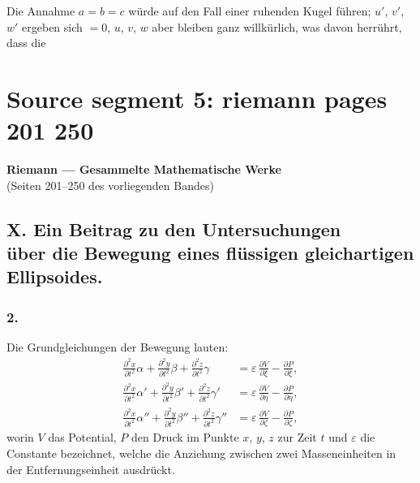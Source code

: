 \documentclass[12pt,a4paper]{book}
\theoremstyle{definition}
\theoremstyle{remark}
\begin{document}
Die Annahme $a = b = c$ w\"urde auf den Fall einer ruhenden Kugel f\"uhren; $u'$, $v'$, $w'$ ergeben sich $= 0$, $u$, $v$, $w$ aber bleiben ganz willk\"urlich, was davon herr\"uhrt, dass die

\clearpage
\chapter*{Source segment 5: riemann pages 201 250}
\begin{center}
{\LARGE\bfseries Riemann --- Gesammelte Mathematische Werke}\\[1em]
{\Large (Seiten 201--250 des vorliegenden Bandes)}\\[2em]
\end{center}

\tableofcontents
\newpage


\section*{X. Ein Beitrag zu den Untersuchungen \\ über die Bewegung eines flüssigen gleichartigen Ellipsoides.}

\subsection*{2.}

Die Grundgleichungen der Bewegung lauten:
\begin{equation}
\tag{1}
\begin{aligned}
\frac{\partial^2 x}{\partial t^2}\alpha + \frac{\partial^2 y}{\partial t^2}\beta + \frac{\partial^2 z}{\partial t^2}\gamma &= \varepsilon\,\frac{\partial V}{\partial \xi} - \frac{\partial P}{\partial \xi},\\
\frac{\partial^2 x}{\partial t^2}\alpha' + \frac{\partial^2 y}{\partial t^2}\beta' + \frac{\partial^2 z}{\partial t^2}\gamma' &= \varepsilon\,\frac{\partial V}{\partial \eta} - \frac{\partial P}{\partial \eta},\\
\frac{\partial^2 x}{\partial t^2}\alpha'' + \frac{\partial^2 y}{\partial t^2}\beta'' + \frac{\partial^2 z}{\partial t^2}\gamma'' &= \varepsilon\,\frac{\partial V}{\partial \zeta} - \frac{\partial P}{\partial \zeta},
\end{aligned}
\end{equation}
worin $V$ das Potential, $P$ den Druck im Punkte $x$, $y$, $z$ zur Zeit $t$ und $\varepsilon$ die Constante bezeichnet, welche die Anziehung zwischen zwei Masseneinheiten in der Entfernungseinheit ausdrückt.
\end{document}
